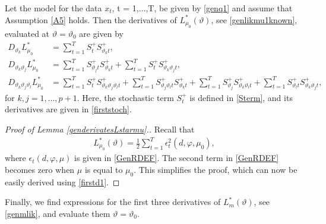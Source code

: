 {{\begin{lemma} \label{genderivatesLstarmu}
Let the model for the data $x_t$, t = 1,$\ldots$,T, be given by \eqref{genq1} and assume that Assumption \ref{A5} holds. Then the derivatives of  $L_{\mu_0}^*(\vartheta)$, see \eqref{genlikmu1known}, evaluated at $\vartheta = \vartheta_0$ are  given by
\begin{align}
     D_{\vartheta_k} L_{\mu_0}^* &= \sum_{t = 1}^T S_{t}^+ S_{\vartheta_k t}^+ , \label{genmuqw11}\\
     D_{\vartheta_k \vartheta_j} L_{\mu_0}^* &= \sum_{t = 1}^T  S_{\vartheta_j t}^+ S_{\vartheta_k t}^+ + \sum_{t = 1}^T  S_{t}^+  S_{ \vartheta_k  \vartheta_j t}^+,  \label{genmuqw12} \\ D_{\vartheta_k \vartheta_j \vartheta_l} L_{\mu_0}^* &= \sum_{t = 1}^T  S_{t}^+  S_{ \vartheta_k \vartheta_j \vartheta_l t}^+   + \sum_{t = 1}^T  S_{\vartheta_j \vartheta_l t}^+ S_{\vartheta_k t}^+ +  \sum_{t = 1}^T S_{\vartheta_j }^+ S_{ \vartheta_k \vartheta_l t}^+ + \sum_{t = 1}^T  S_{\vartheta_l t}^+ S_{ \vartheta_k \vartheta_j t}^+, \label{genmuqw13}
\end{align}
for $k,j = 1,\ldots, p+1$.  Here, the stochastic term $S_{t}^+$ is defined in \eqref{Sterm}, and its derivatives are given in \eqref{firststoch}.
\end{lemma}
\begin{proof}[Proof of Lemma \ref{genderivatesLstarmu}.]
Recall that
\begin{align*}
     L_{\mu_0}^*(\vartheta) = \frac{1}{2} \sum_{t = 1}^T \epsilon^2_t(d, \varphi, \mu_0),
\end{align*}
where  $\epsilon_t(d, \varphi, \mu)$ is given in \eqref{GenRDEF}. The second term in \eqref{GenRDEF} becomes zero when $\mu$ is equal to $\mu_0$. This simplifies the proof, which can now be easily derived using \eqref{firstd1}.
\end{proof}



Finally, we find expressions for the first three derivatives of $L_m^*(\vartheta)$, see \eqref{genmlik}, and evaluate them $\vartheta = \vartheta_0$. 

}}
